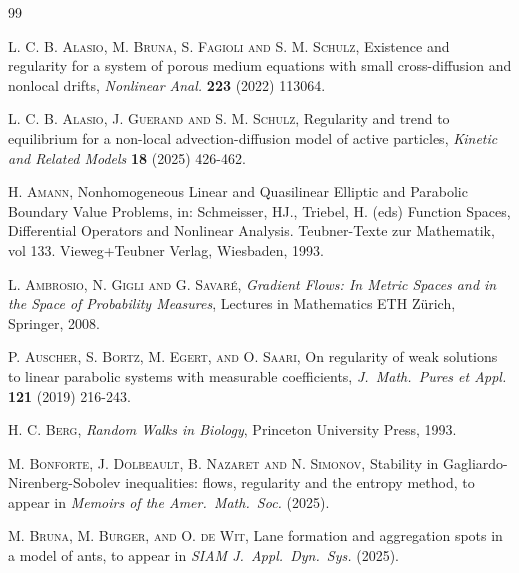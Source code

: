 \documentclass[11pt,a4paper,reqno]{amsart}
\theoremstyle{remark}
\theoremstyle{definition}
\numberwithin{equation}{section}
\begin{document}
\begin{thebibliography}{99}

\begin{footnotesize}

\textsc{L. C. B. Alasio, M. Bruna, S. Fagioli and S. M. Schulz},
\newblock Existence and regularity for a system of porous medium equations with small cross-diffusion and nonlocal drifts, 
\newblock \textit{Nonlinear Anal.} \textbf{223} (2022) 113064.

\newblock \textsc{L. C. B. Alasio, J. Guerand and S. M. Schulz},
\newblock Regularity and trend to equilibrium for a non-local advection-diffusion model of active particles,
\newblock \textit{Kinetic and Related Models} \textbf{18} (2025) 426-462. 

\newblock \textsc{H. Amann},
\newblock Nonhomogeneous Linear and Quasilinear Elliptic and Parabolic Boundary Value Problems, 
\newblock in: Schmeisser, HJ., Triebel, H. (eds) Function Spaces, Differential Operators and Nonlinear Analysis. Teubner-Texte zur Mathematik, vol 133. Vieweg+Teubner Verlag, Wiesbaden, 1993. 

\newblock \textsc{L. Ambrosio, N. Gigli and G. Savar\'e},
\newblock \textit{Gradient Flows:
In Metric Spaces and in the Space of Probability Measures}, 
\newblock Lectures in Mathematics ETH Zürich, Springer, 2008. 

\newblock \textsc{P. Auscher, S. Bortz, M. Egert, and O. Saari},
\newblock On regularity of weak solutions to linear parabolic
systems with measurable coefficients, 
\newblock \textit{J.~Math.~Pures et Appl.} \textbf{121} (2019) 216-243. 

\newblock \textsc{H. C. Berg},
\newblock \textit{Random Walks in Biology}, 
\newblock Princeton University Press, 1993.




\newblock \textsc{M. Bonforte, J. Dolbeault, B. Nazaret and N. Simonov}, 
\newblock Stability in Gagliardo-Nirenberg-Sobolev inequalities: flows, regularity and the entropy method, 
\newblock to appear in \textit{Memoirs of the Amer.~Math.~Soc.} (2025).

\newblock \textsc{M. Bruna, M. Burger, and O. de Wit},
\newblock Lane formation and aggregation spots in a model of ants, 
\newblock to appear in \textit{SIAM J.~Appl.~Dyn.~Sys.} (2025). 


\end{footnotesize}
\end{thebibliography}
\end{document}
